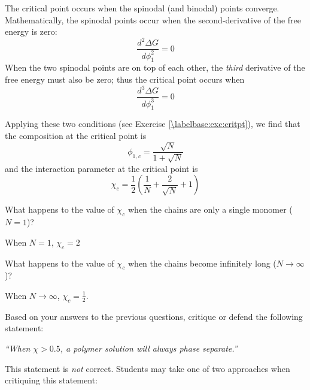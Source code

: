 \begin{activity}
\begin{infobox}
	The critical point occurs when the spinodal (and binodal) points converge.  Mathematically, the spinodal points occur when the second-derivative of the free energy is zero:
	\begin{equation*}
		\frac{d^2\Delta G}{d\phi_1^2} = 0
	\end{equation*}
	When the two spinodal points are on top of each other, the \emph{third} derivative of the free energy must also be zero; thus the critical point occurs when 
	\begin{equation*}
		\frac{d^3\Delta G}{d\phi_1^3} = 0
	\end{equation*}
	
	Applying these two conditions (see Exercise \ref{\labelbase:exc:critpt}), we find that the composition at the critical point is
	\begin{equation*}
		\phi_{1,c} = \frac{\sqrt{N}}{1+\sqrt{N}}
		\label{\labelbase:eqn:phi1c}
	\end{equation*}
	and the interaction parameter at the critical point is
	\begin{equation*}
		\chi_c = \frac{1}{2}\left(\frac{1}{N} + \frac{2}{\sqrt{N}} + 1\right)
		\label{\labelbase:eqn:chic}
	\end{equation*}
	
\end{infobox}



\begin{ctqs}
	
	\question What happens to the value of $\chi_c$ when the chains are only a single monomer ($N=1$)?
	
		\begin{solution}[0.75in]
			When $N=1$, $\chi_c = 2$
		\end{solution}
	
	\question What happens to the value of $\chi_c$ when the chains become infinitely long ($N\to\infty$)?	
	
		\begin{solution}[0.75in]
			When $N\to\infty$, $\chi_c = \frac{1}{2}$.
		\end{solution}
	
	\question Based on your answers to the previous questions, critique or defend the following statement:
	
		\emph{``When $\chi > 0.5$, a polymer solution will always phase separate.'' }
	
		\begin{solution}[2.5in]
			This statement is \emph{not} correct.  Students may take one of two approaches when critiquing this statement:
			

\end{solution}
\end{ctqs}
\end{activity}
